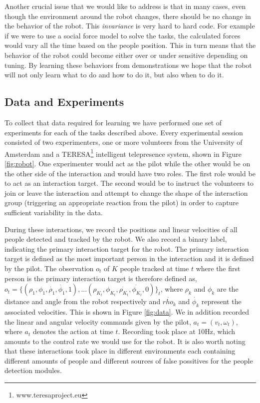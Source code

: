 \documentclass[letterpaper, 10 pt, conference]{ieeeconf}
\begin{document}
Another crucial issue that we would like to address is that in many cases, even though the environment around the robot changes, there should be no change in the behavior of the robot. This \emph{invariance} is very hard to hard code. For example if we were to use a social force model to solve the tasks, the calculated forces would vary all the time based on the people position. This in turn means that the behavior of the robot could become either over or under sensitive depending on tuning. By learning these behaviors from demonstrations we hope that the robot will not only learn what to do and how to do it, but also when to do it.


\subsection{Data and Experiments \label{subsec:data_exp}} 

To collect that data required for learning we have performed one set of experiments for each of the tasks described above. Every experimental session consisted of two experimenters, one or more volunteers from the University of Amsterdam and a TERESA\footnote{www.teresaproject.eu} intelligent telepresence system, shown in Figure \ref{fig:robot}.  One experimenter would act as the pilot while the other would be on the other side of the interaction and would have two roles. The first role would be to act as an interaction target. The second would be to instruct the volunteers to join or leave the interaction and attempt to change the shape of the interaction group (triggering an appropriate reaction from the pilot) in order to capture sufficient variability in the data.  

During these interactions, we record the positions and linear velocities of all people detected and tracked by the robot. We also record a binary label, indicating the primary interaction target for the robot. The primary interaction target is defined as the most important person in the interaction and it is defined by the pilot. The observation $o_t$ of $K$ people tracked at time $t$ where the first person is the primary interaction target is therefore defined as, $o_t = \{(\rho_1,\phi_1,\dot{\rho_1},\dot{\phi_1},1),... (\rho_{K_t},\phi_{K_t},\dot{\rho_{K_t}},\dot{\phi_{K_t}},0)\}_t$, where $\rho_k$ and $\phi_k$ are the distance and angle from the robot respectively and $\dot{rho_k}$ and $\dot{\phi_k}$ represent the associated velocities. This is shown in Figure \ref{fig:data}. We in addition recorded the linear and angular velocity commands given by the pilot, $a_t = (v_t,\omega_t)$, where $a_t$ denotes the action at time $t$. Recording took place at 10Hz, which amounts to the control rate we would use for the robot.  It is also worth noting that these interactions took place in different environments each containing different amounts of people and different sources of false possitives for the people detection modules.
\end{document}
